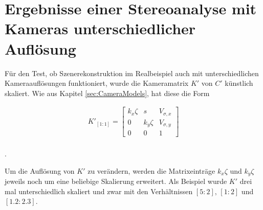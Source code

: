 \label{sec:realAuf} 

\section{Ergebnisse einer Stereoanalyse mit Kameras unterschiedlicher Auflösung}

Für den Test, ob Szenerekonstruktion im Realbeispiel auch mit unterschiedlichen Kameraauflösungen funktioniert, wurde die Kameramatrix $K'$ von $C'$ künstlich skaliert. Wie aus Kapitel \ref{sec:CameraModels}, hat diese die Form



\begin{gather}
K'_{[1:1]}=\begin{bmatrix}
k_x\zeta&s&V_{\sigma,x}\\
0&k_y\zeta&V_{\sigma,y}\\
0&0&1
\end{bmatrix}
\end{gather} \\
.


Um die Auflösung von $K'$ zu verändern, werden die Matrixeinträge $k_x \zeta$ und $k_y \zeta$ jeweils noch um eine beliebige Skalierung erweitert. Als Beispiel wurde $K'$ drei mal unterschiedlich skaliert und zwar mit den Verhältnissen $[5:2],\, [1:2]$ und $[1.2:2.3]$.  


